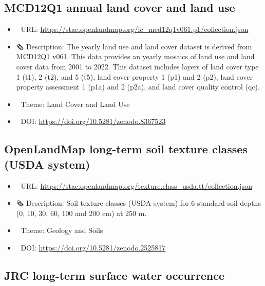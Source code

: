 \documentclass[
  graybox,natbib,nospthms]{svmono}
\providecommand{\tightlist}{%
  \setlength{\itemsep}{0pt}\setlength{\parskip}{0pt}}
\providecommand{\tightlist}{\setlength{\itemsep}{0pt}\setlength{\parskip}{0pt}}
\begin{document}
\hypertarget{mcd12q1-annual-land-cover-and-land-use}{%
\subsection{MCD12Q1 annual land cover and land use}\label{mcd12q1-annual-land-cover-and-land-use}}

\begin{itemize}
\tightlist
\item
  🔗 URL: \url{https://stac.openlandmap.org/lc_mcd12q1v061.p1/collection.json}
\item
  🗞 Description: The yearly land use and land cover dataset is derived from MCD12Q1 v061. This data provides an yearly mosaics of land use and land cover data from 2001 to 2022. This dataset includes layers of land cover type 1 (t1), 2 (t2), and 5 (t5), land cover property 1 (p1) and 2 (p2), land cover property assessment 1 (p1a) and 2 (p2a), and land cover quality control (qc).
\item
  📝 Theme: Land Cover and Land Use
\item
  📂 DOI: \url{https://doi.org/10.5281/zenodo.8367523}
\end{itemize}

\hypertarget{openlandmap-long-term-soil-texture-classes-usda-system}{%
\subsection{OpenLandMap long-term soil texture classes (USDA system)}\label{openlandmap-long-term-soil-texture-classes-usda-system}}

\begin{itemize}
\tightlist
\item
  🔗 URL: \url{https://stac.openlandmap.org/texture.class_usda.tt/collection.json}
\item
  🗞 Description: Soil texture classes (USDA system) for 6 standard soil depths (0, 10, 30, 60, 100 and 200 cm) at 250 m.
\item
  📝 Theme: Geology and Soils
\item
  📂 DOI: \url{https://doi.org/10.5281/zenodo.2525817}
\end{itemize}

\hypertarget{jrc-long-term-surface-water-occurrence}{%
\subsection{JRC long-term surface water occurrence}\label{jrc-long-term-surface-water-occurrence}}
\end{document}
